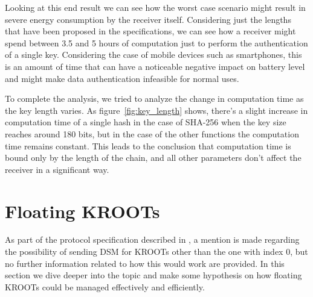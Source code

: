 Looking at this end result we can see how the worst case scenario might result
in severe energy consumption by the receiver itself. Considering just the
lengths that have been proposed in the specifications, we can see how a receiver
might spend between 3.5 and 5 hours of computation just to perform the
authentication of a single key. Considering the case of mobile devices such as
smartphones, this is an amount of time that can have a noticeable negative
impact on battery level and might make data authentication infeasible for normal
uses.

To complete the analysis, we tried to analyze the change in computation time as
the key length varies. As figure~\ref{fig:key_length} shows, there's a slight
increase in computation time of a single hash in the case of SHA-256 when the
key size reaches around 180 bits, but in the case of the other functions the
computation time remains constant. This leads to the conclusion that computation
time is bound only by the length of the chain, and all other parameters don't
affect the receiver in a significant way.

\section{Floating KROOTs}
As part of the protocol specification described in \cite{tesla_gal}, a mention
is made regarding the possibility of sending DSM for KROOTs other than the one
with index $0$, but no further information related to how this would work are
provided. In this section we dive deeper into the topic and make some hypothesis
on how floating KROOTs could be managed effectively and efficiently.

